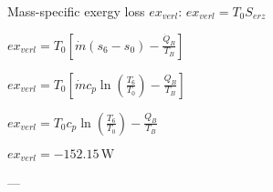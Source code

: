 Mass-specific exergy loss \( ex_{verl} \):  
\( ex_{verl} = T_0 S_{erz} \)  

\( ex_{verl} = T_0 \left[ \dot{m} (s_6 - s_0) - \frac{\dot{Q}_B}{T_B} \right] \)  

\( ex_{verl} = T_0 \left[ \dot{m} c_p \ln \left( \frac{T_6}{T_0} \right) - \frac{Q_B}{T_B} \right] \)  

\( ex_{verl} = T_0 c_p \ln \left( \frac{T_6}{T_0} \right) - \frac{Q_B}{T_B} \)  

\( ex_{verl} = -152.15 \, \text{W} \)  

---